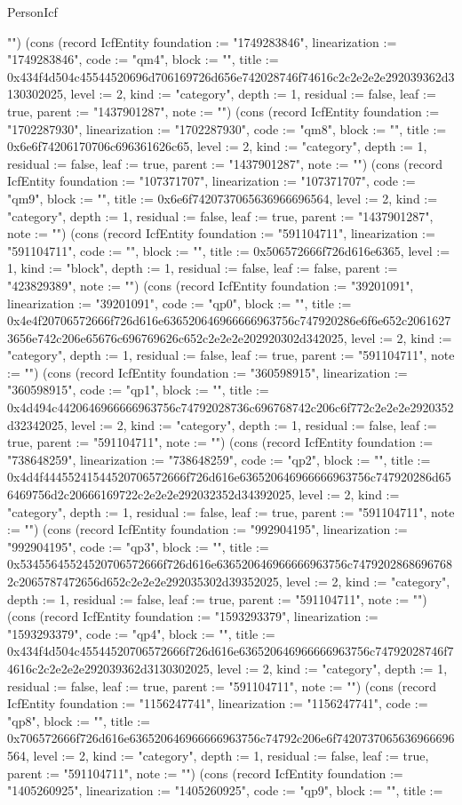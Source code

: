 \begin{lexlean}{PersonIcf}
\begin{semanticmodule}
{""}) (cons (record IcfEntity {foundation := "1749283846", linearization := "1749283846", code := "qm4", block := "", title := 0x434f4d504c45544520696d706169726d656e742028746f74616c2c2e2e2e292039362d3130302025, level := 2, kind := "category", depth := 1, residual := false, leaf := true, parent := "1437901287", note := ""}) (cons (record IcfEntity {foundation := "1702287930", linearization := "1702287930", code := "qm8", block := "", title := 0x6e6f74206170706c696361626c65, level := 2, kind := "category", depth := 1, residual := false, leaf := true, parent := "1437901287", note := ""}) (cons (record IcfEntity {foundation := "107371707", linearization := "107371707", code := "qm9", block := "", title := 0x6e6f7420737065636966696564, level := 2, kind := "category", depth := 1, residual := false, leaf := true, parent := "1437901287", note := ""}) (cons (record IcfEntity {foundation := "591104711", linearization := "591104711", code := "", block := "", title := 0x506572666f726d616e6365, level := 1, kind := "block", depth := 1, residual := false, leaf := false, parent := "423829389", note := ""}) (cons (record IcfEntity {foundation := "39201091", linearization := "39201091", code := "qp0", block := "", title := 0x4e4f20706572666f726d616e636520646966666963756c747920286e6f6e652c20616273656e742c206e65676c696769626c652c2e2e2e202920302d342025, level := 2, kind := "category", depth := 1, residual := false, leaf := true, parent := "591104711", note := ""}) (cons (record IcfEntity {foundation := "360598915", linearization := "360598915", code := "qp1", block := "", title := 0x4d494c4420646966666963756c74792028736c696768742c206c6f772c2e2e2e2920352d32342025, level := 2, kind := "category", depth := 1, residual := false, leaf := true, parent := "591104711", note := ""}) (cons (record IcfEntity {foundation := "738648259", linearization := "738648259", code := "qp2", block := "", title := 0x4d4f44455241544520706572666f726d616e636520646966666963756c747920286d656469756d2c20666169722c2e2e2e292032352d34392025, level := 2, kind := "category", depth := 1, residual := false, leaf := true, parent := "591104711", note := ""}) (cons (record IcfEntity {foundation := "992904195", linearization := "992904195", code := "qp3", block := "", title := 0x53455645524520706572666f726d616e636520646966666963756c74792028686967682c2065787472656d652c2e2e2e292035302d39352025, level := 2, kind := "category", depth := 1, residual := false, leaf := true, parent := "591104711", note := ""}) (cons (record IcfEntity {foundation := "1593293379", linearization := "1593293379", code := "qp4", block := "", title := 0x434f4d504c45544520706572666f726d616e636520646966666963756c74792028746f74616c2c2e2e2e292039362d3130302025, level := 2, kind := "category", depth := 1, residual := false, leaf := true, parent := "591104711", note := ""}) (cons (record IcfEntity {foundation := "1156247741", linearization := "1156247741", code := "qp8", block := "", title := 0x706572666f726d616e636520646966666963756c74792c206e6f7420737065636966696564, level := 2, kind := "category", depth := 1, residual := false, leaf := true, parent := "591104711", note := ""}) (cons (record IcfEntity {foundation := "1405260925", linearization := "1405260925", code := "qp9", block := "", title := }
\end{semanticmodule}
\end{lexlean}
